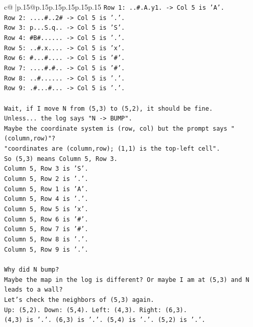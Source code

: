 \documentclass{article}
\begin{document}
{\begin{supertabular}{c@{$\;$}|p{.15\linewidth}@{}p{.15\linewidth}p{.15\linewidth}p{.15\linewidth}p{.15\linewidth}p{.15\linewidth}}
{{{\texttt{Row 1: ..\#.A.y1. {-}> Col 5 is 'A'.} \\
\texttt{Row 2: ....\#..2\# {-}> Col 5 is '.'.} \\
\texttt{Row 3: p...S.q.. {-}> Col 5 is 'S'.} \\
\texttt{Row 4: \#B\#...... {-}> Col 5 is '.'.} \\
\texttt{Row 5: ..\#.x.... {-}> Col 5 is 'x'.} \\
\texttt{Row 6: \#...\#.... {-}> Col 5 is '\#'.} \\
\texttt{Row 7: ....\#.\#.. {-}> Col 5 is '\#'.} \\
\texttt{Row 8: ..\#...... {-}> Col 5 is '.'.} \\
\texttt{Row 9: .\#...\#... {-}> Col 5 is '.'.} \\
\\ 
\texttt{Wait, if I move N from (5,3) to (5,2), it should be fine.} \\
\texttt{Unless... the log says "N {-}> BUMP".} \\
\texttt{Maybe the coordinate system is (row, col) but the prompt says "(column,row)"?} \\
\texttt{"coordinates are (column,row); (1,1) is the top{-}left cell".} \\
\texttt{So (5,3) means Column 5, Row 3.} \\
\texttt{Column 5, Row 3 is 'S'.} \\
\texttt{Column 5, Row 2 is '.'.} \\
\texttt{Column 5, Row 1 is 'A'.} \\
\texttt{Column 5, Row 4 is '.'.} \\
\texttt{Column 5, Row 5 is 'x'.} \\
\texttt{Column 5, Row 6 is '\#'.} \\
\texttt{Column 5, Row 7 is '\#'.} \\
\texttt{Column 5, Row 8 is '.'.} \\
\texttt{Column 5, Row 9 is '.'.} \\
\\ 
\texttt{Why did N bump?} \\
\texttt{Maybe the map in the log is different? Or maybe I am at (5,3) and N leads to a wall?} \\
\texttt{Let's check the neighbors of (5,3) again.} \\
\texttt{Up: (5,2). Down: (5,4). Left: (4,3). Right: (6,3).} \\
\texttt{(4,3) is '.'. (6,3) is '.'. (5,4) is '.'. (5,2) is '.'.} \\
}}}
\end{supertabular}}
\end{document}
